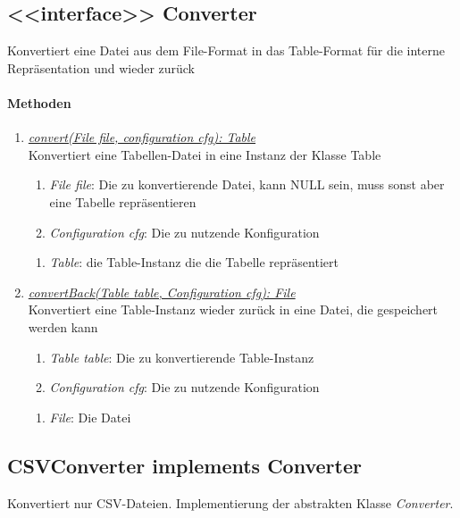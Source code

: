 \subsection{<{<{interface}>}> Converter}
Konvertiert eine Datei aus dem File-Format in das Table-Format für die interne Repräsentation und wieder zurück \\

\paragraph{Methoden}
\begin{enumerate}[+]
	\item \underline{\textit{convert(File file, configuration cfg): Table}} \\
	Konvertiert eine Tabellen-Datei in eine Instanz der Klasse Table
	
	\begin{enumerate}[$\bullet$]
		\item \textit{File file}: Die zu konvertierende Datei, kann NULL sein, muss sonst aber eine Tabelle repräsentieren
		\item \textit{Configuration cfg}: Die zu nutzende Konfiguration
	\end{enumerate}
	\vspace{-0.2cm}
	\begin{enumerate}[$\circ$]
		\item \textit{Table}: die Table-Instanz die die Tabelle repräsentiert
	\end{enumerate}

	\item \underline{\textit{convertBack(Table table, Configuration cfg): File}} \\
	Konvertiert eine Table-Instanz wieder zurück in eine Datei, die gespeichert werden kann
	\begin{enumerate}[$\bullet$]
		\item \textit{Table table}: Die zu konvertierende Table-Instanz
		\item \textit{Configuration cfg}: Die zu nutzende Konfiguration
	\end{enumerate}
	\vspace{-0.2cm}
	\begin{enumerate}[$\circ$]
		\item \textit{File}: Die Datei
	\end{enumerate}
\end{enumerate}


\subsection{CSVConverter implements Converter}
Konvertiert nur CSV-Dateien. Implementierung der abstrakten Klasse \textit{Converter}. \\


